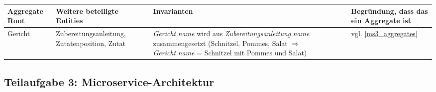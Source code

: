 \begin{center}
\begin{tabu} to 
\hline
Aggregate Root &Weitere beteiligte Entities &Invarianten
  &Begr\"undung, dass das ein Aggregate ist \\
\hline
Gericht &Zubereitungsanleitung, Zutatenposition, Zutat
  &\textit{Gericht.name} wird aus
  \textit{Zubereitungsanleitung.name}
  zusammengesetzt (Schnitzel, Pommes, Salat $\Rightarrow$
  \textit{Gericht.name} = Schnitzel mit Pommes und Salat)
  &vgl. \ref{ms3_aggregates} \\
\end{tabu}
\end{center}

\subsection{Teilaufgabe 3: Microservice-Architektur}

